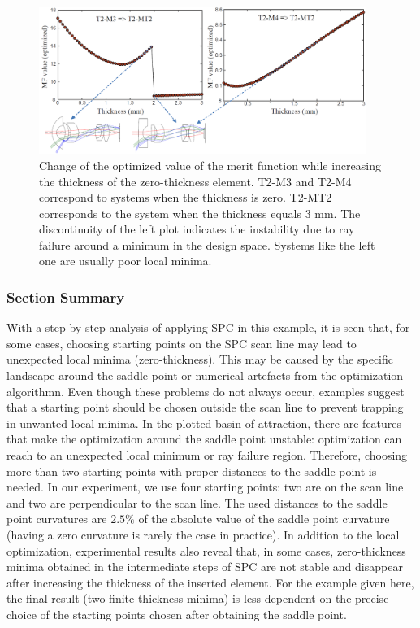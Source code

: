 \begin{figure}[h!]
    \centering
    \includegraphics[width=0.95\textwidth]{chapter-4/figures/thickness_increase.png}
    \caption{Change of the optimized value of the merit function while increasing the thickness of the zero-thickness element. T2-M3 and T2-M4 correspond to systems when the thickness is zero. T2-MT2 corresponds to the system when the thickness equals 3 mm. The discontinuity of the left plot indicates the instability due to ray failure around a minimum in the design space. Systems like the left one are usually poor local minima.}
    \label{fig:thickness_increase}
\end{figure}

\clearpage
\subsubsection{Section Summary}
With a step by step analysis of applying SPC in this example, it is seen that, for some cases, choosing starting points on the SPC scan line may lead to unexpected local minima (zero-thickness). This may be caused by the specific landscape around the saddle point or numerical artefacts from the optimization algorithmn. Even though these problems do not always occur, examples suggest that a starting point should be chosen outside the scan line to prevent trapping in unwanted local minima. In the plotted basin of attraction, there are features that make the optimization around the saddle point unstable: optimization can reach to an unexpected local minimum or ray failure region. Therefore, choosing more than two starting points with proper distances to the saddle point is needed. In our experiment, we use four starting points: two are on the scan line and two are perpendicular to the scan line. The used distances to the saddle point curvatures are $2.5\%$ of the absolute value of the saddle point curvature (having a zero curvature is rarely the case in practice). In addition to the local optimization, experimental results also reveal that, in some cases, zero-thickness minima obtained in the intermediate steps of SPC are not stable and disappear after increasing the thickness of the inserted element. For the example given here, the final result (two finite-thickness minima) is less dependent on the precise choice of the starting points chosen after obtaining the saddle point.  

